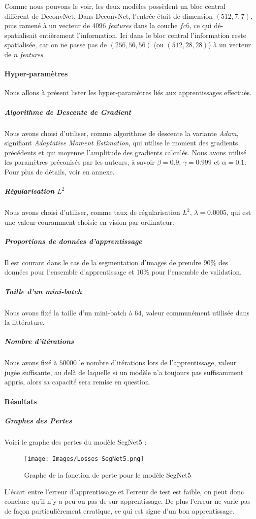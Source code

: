 \documentclass[a4paper, 11pt]{report}
\begin{document}
Comme nous pouvons le voir, les deux modèles possèdent un bloc central différent de DeconvNet.
Dans DeconvNet, l'entrée était de dimension $(512, 7, 7)$, puis ramené à un vecteur de 4096 \emph{features} dans la couche $fc6$, ce qui dé-spatialisait entièrement l'information.
Ici dans le bloc central l'information reste spatialisée, car on ne passe pas de $(256, 56, 56)$ (ou $(512, 28, 28)$) à un vecteur de $n$ \emph{features}.

\paragraph{Hyper-paramètres}
Nous allons à présent lister les hyper-paramètres liés aux apprentissages effectués.
\subparagraph{Algorithme de Descente de Gradient}
Nous avons choisi d'utiliser, comme algorithme de descente la variante \emph{Adam}, signifiant \emph{Adaptative Moment Estimation}, qui utilise le moment des gradients précédents et qui moyenne l'amplitude des gradients calculés.
Nous avons utilisé les paramètres préconisés par les auteurs, à savoir $\beta = 0.9$, $\gamma = 0.999$ et $\alpha = 0.1$.
Pour plus de détails, voir en annexe.
\subparagraph{Régularisation $L^2$}
Nous avons choisi d'utiliser, comme taux de régularisation $L^2$, $\lambda = 0.0005$, qui est une valeur couramment choisie en vision par ordinateur.
\subparagraph{Proportions de données d'apprentissage}
Il est courant dans le cas de la segmentation d'images de prendre $90\%$ des données pour l'ensemble d'apprentissage et $10\%$ pour l'ensemble de validation.
\subparagraph{Taille d'un \emph{mini-batch}}
Nous avons fixé la taille d'un mini-batch à $64$, valeur communément utilisée dans la littérature.
\subparagraph{Nombre d'itérations}
Nous avons fixé à $50000$ le nombre d'itérations lors de l'apprentissage, valeur jugée suffisante, au delà de laquelle si un modèle n'a toujours pas suffisamment appris, alors sa capacité sera remise en question.
\paragraph{Résultats}
\subparagraph{Graphes des Pertes}
Voici le graphe des pertes du modèle SegNet5 :
\begin{figure}[H]
	\begin{center}
		\texttt{[image: Images/Losses\_SegNet5.png]}
		\caption{Graphe de la fonction de perte pour le modèle SegNet5}
	\end{center}
\end{figure}
L'écart entre l'erreur d'apprentissage et l'erreur de test est faible, on peut donc conclure qu'il n'y a peu ou pas de sur-apprentissage.
De plus l'erreur ne varie pas de façon particulièrement erratique, ce qui est signe d'un bon apprentissage.
\end{document}
